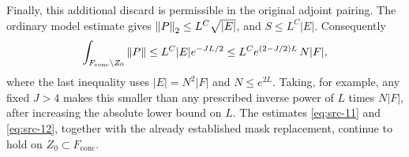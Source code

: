 Finally, this additional discard is permissible in the original
adjoint pairing.  The ordinary model estimate gives
$\left\|P\right\|_2\leq L^C\sqrt{|E|}$, and $S\leq L^C|E|$.
Consequently
\begin{equation}\label{count:discard-cost}
 \int_{F_{\mathrm{conc}}\setminus Z_0}\left\|P\right\|
 \leq L^C|E|e^{-JL/2}
 \leq L^C e^{(2-J/2)L}\,N|F|,
\end{equation}
where the last inequality uses $|E|=N^2|F|$ and $N\leq e^{2L}$.
Taking, for example, any fixed $J>4$ makes this smaller than
any prescribed inverse power of $L$ times $N|F|$, after
increasing the absolute lower bound on $L$.  The estimates
\eqref{eq:src-11} and \eqref{eq:src-12}, together with the
already established mask replacement, continue to hold on
$Z_0\subset F_{\mathrm{conc}}$.
